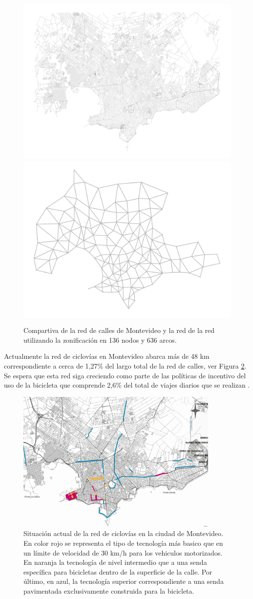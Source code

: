 \begin{figure}[h!]
  \centering
  \includegraphics[width=.49\linewidth]{../resources/montevideo_full.png}
  \includegraphics[width=.49\linewidth]{../resources/montevideo_simple.png}
  \caption{Compartiva de la red de calles de Montevideo y la red de la red utilizando la zonificación en 136 nodos y 636 arcos.}
  \label{fig:montevideosimplification}
\end{figure}

Actualmente la red de ciclovías en Montevideo abarca más de 48 km correspondiente a cerca de 1,27\% del largo total de la red de calles, ver Figura \ref{fig:montevideobikeways}. Se espera que esta red siga creciendo como parte de las políticas de incentivo del uso de la bicicleta que comprende 2,6\% del total de viajes diarios que se realizan \cite{Mauttone2017a}.

\begin{figure}[h!]
  \centering
  \includegraphics[width=10cm]{../resources/bicicircuitos_montevideo.png}
  \caption{Situación actual de la red de ciclovías en la ciudad de Montevideo. En color rojo se representa el tipo de tecnología más basico que en un límite de velocidad de 30 km/h para los vehiculos motorizados. En naranja la tecnología de nivel intermedio que a una senda específica para bicicletas dentro de la superficie de la calle. Por último, en azul, la tecnología superior correspondiente a una senda pavimentada exclusivamente construida para la bicicleta.}
  \label{fig:montevideobikeways}
\end{figure}

